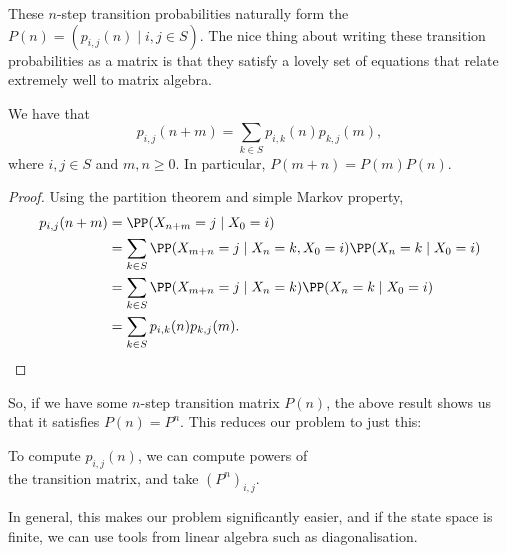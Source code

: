 \documentclass[a4paper]{scrartcl}
\begin{document}
These $n$-step transition probabilities naturally form the  $P(n) = (p_{i, j}(n) \mid i, j \in S)$. The nice thing about writing these transition probabilities as a matrix is that they satisfy a lovely set of equations that relate extremely well to matrix algebra.

\begin{theorem}
	We have that
	$$
	p_{i, j}(n + m) = \sum_{k \in S} p_{i, k}(n)p_{k, j}(m),
	$$
	where $i, j \in S$ and $m, n \geq 0$. In particular, $P(m + n) = P(m)P(n)$.
\end{theorem}
\begin{proof}
	Using the partition theorem and simple Markov property,
	\begin{align*}
		p_{i, j}(n + m) &= \PP(X_{n + m} = j \mid X_0 = i) \\
		&= \sum_{k \in S} \PP(X_{m + n} = j \mid X_n = k, X_0 = i) \PP(X_n = k \mid X_0 = i) \\
		&= \sum_{k \in S} \PP(X_{m + n} = j \mid X_n = k) \PP(X_n = k \mid X_0 = i) \\
		&= \sum_{k \in S} p_{i, k}(n) p_{k, j}(m).
	\end{align*}
\end{proof}

So, if we have some $n$-step transition matrix $P(n)$, the above result shows us that it satisfies $P(n) = P^n$. This reduces our problem to just this:

\begin{center}
	\color{blue}
	To compute $p_{i, j}(n)$, we can compute powers of\\ the transition matrix, and take $(P^n)_{i, j}$.
\end{center}

In general, this makes our problem significantly easier, and if the state space is finite, we can use tools from linear algebra such as diagonalisation.
\end{document}
